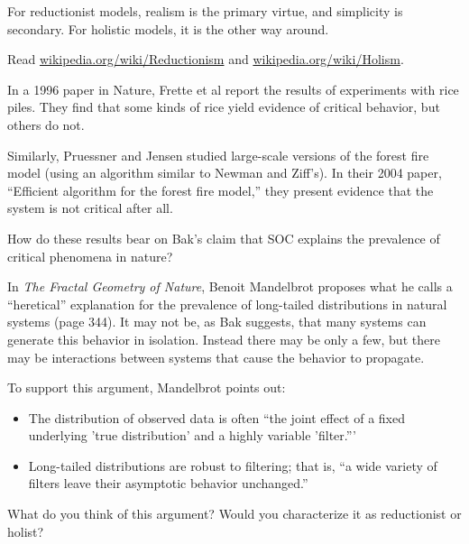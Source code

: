 \documentclass[10pt]{book}
\begin{document}
For reductionist models, realism is the primary virtue, and
simplicity is secondary.  For holistic models, it is the other
way around.

\begin{exercise}

Read \url{wikipedia.org/wiki/Reductionism}
and \url{wikipedia.org/wiki/Holism}.

\end{exercise}


\begin{exercise}

In a 1996 paper in Nature, Frette et al report the results of
experiments with rice piles.  They find that some kinds of rice
yield evidence of critical behavior, but others do not.

Similarly, Pruessner and Jensen studied large-scale versions of the
forest fire model (using an algorithm similar to Newman and Ziff's).
In their 2004 paper, ``Efficient algorithm for the forest fire model,''
they present evidence that the system is not critical after all.

How do these results bear on Bak's claim that SOC explains
the prevalence of critical phenomena in nature?

\end{exercise}


\begin{exercise}

In {\em The Fractal Geometry of Nature}, Benoit Mandelbrot proposes
what he calls a ``heretical'' explanation for the prevalence of
long-tailed distributions in natural systems (page 344).  It may not
be, as Bak suggests, that many systems can generate this behavior in
isolation.  Instead there may be only a few, but there may be
interactions between systems that cause the behavior to propagate.
  

To support this argument, Mandelbrot points out:

\begin{itemize}

\item The distribution of observed data is often ``the joint
  effect of a fixed underlying 'true distribution' and a highly
  variable 'filter.'''

\item Long-tailed distributions are robust to filtering; that is,
  ``a wide variety of filters leave their asymptotic behavior
  unchanged.''

\end{itemize}

What do you think of this argument?  Would you characterize
it as reductionist or holist?

\end{exercise}
\end{document}
